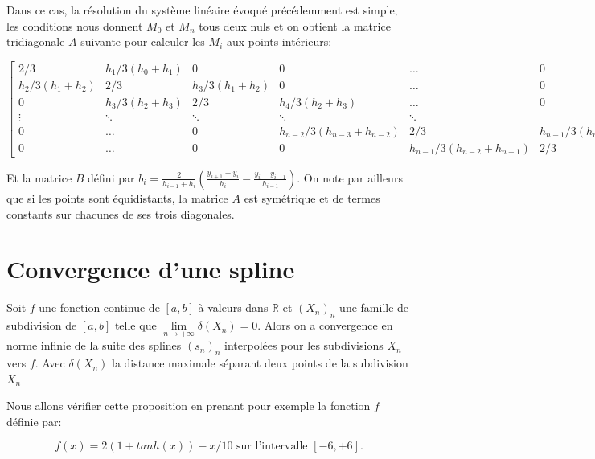 Dans ce cas, la résolution du système linéaire évoqué précédemment est simple,
les conditions nous donnent $M_0$ et $M_n$ tous deux nuls et on obtient la matrice tridiagonale
$A$ suivante pour calculer les $M_i$ aux points intérieurs:

\begingroup
\footnotesize
\[
\begin{bmatrix}
    2/3 & h_1/3(h_0+h_1) & 0 & 0 & \dots  & 0 \\
    h_2/3(h_1+h_2) & 2/3 & h_3/3(h_1+h_2) & 0 & \dots  & 0 \\
    0 &  h_3/3(h_2+h_3) & 2/3 & h_4/3(h_2+h_3) & \dots & 0 \\
    \vdots & \ddots & \ddots & \ddots & \ddots \\
    0 & \dots & 0 & h_{n-2}/3(h_{n-3}+h_{n-2}) & 2/3 & h_{n-1}/3(h_{n-3}+h_{n-2}) \\
    0 & \dots & 0 & 0 & h_{n-1}/3(h_{n-2}+h_{n-1}) & 2/3
\end{bmatrix}
\]
\endgroup

\vspace{0.5em}
Et la matrice $B$ défini par $b_i =  \frac{2}{h_{i-1}+h_{i}} (\frac{y_{i+1} - y_{i}}{h_{i}} - \frac{y_{i} - y_{i-1}}{h_{i-1}})$.
On note par ailleurs que si les points sont équidistants, la matrice $A$ est symétrique et de termes constants sur chacunes de ses trois diagonales.

\section{Convergence d'une spline}
\begin{proposition}
Soit $f$ une fonction continue de $[a,b]$ à valeurs dans $\mathbb{R}$ et $(X_n)_n$ une famille de subdivision de $[a,b]$ telle que
$\lim\limits_{n \rightarrow +\infty} \delta(X_n) =  0$. Alors on a convergence en norme infinie de la suite des splines $(s_n)_n$ interpolées
pour les subdivisions $X_n$ vers $f$.
Avec $\delta(X_n)$ la distance maximale séparant deux points de la subdivision $X_n$
\end{proposition}

Nous allons vérifier cette proposition en prenant pour exemple la fonction $f$ définie par:

\[ f(x) = 2(1 + tanh(x)) - x/10 \text{ sur l'intervalle } [-6,+6]\text{.} \]

